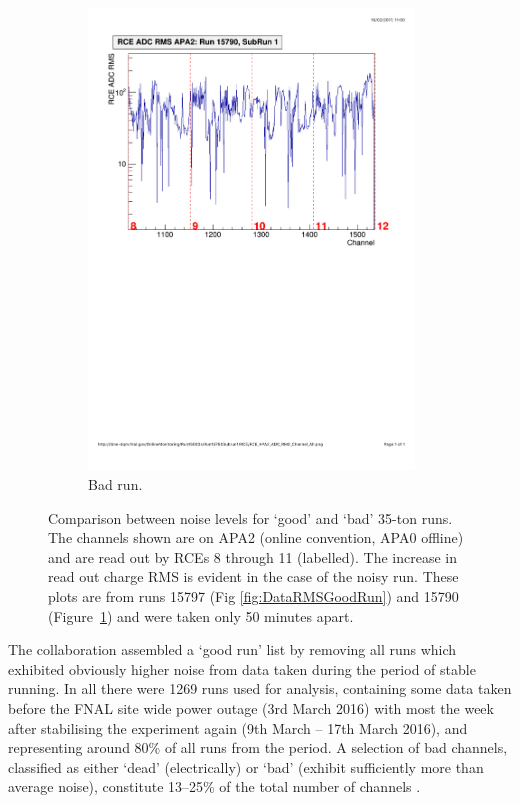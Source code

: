 \begin{figure}
\begin{subfigure}{0.45\linewidth}
  \end{subfigure}
  \hfill
  \begin{subfigure}{0.45\linewidth}
    \centering
    \includegraphics[width=0.95\textwidth]{DataRMSBad.pdf}
    \caption{Bad run.}
    \label{fig:DataRMSBadRun}
  \end{subfigure}
  \caption[Comparison between noise levels for `good' and `bad' 35-ton runs.]{Comparison between noise levels for `good' and `bad' 35-ton runs.  The channels shown are on APA2 (online convention, APA0 offline) and are read out by RCEs 8 through 11 (labelled).  The increase in read out charge RMS is evident in the case of the noisy run.  These plots are from runs 15797 (Fig \ref{fig:DataRMSGoodRun}) and 15790 (Figure~\ref{fig:DataRMSBadRun}) and were taken only 50 minutes apart.}
  \label{fig:DataRMS}
\end{figure}

The collaboration assembled a `good run' list by removing all runs which exhibited obviously higher noise from data taken during the period of stable running.  In all there were 1269 runs used for analysis, containing some data taken before the FNAL site wide power outage (3rd March 2016) with most the week after stabilising the experiment again (9th March -- 17th March 2016), and representing around 80\% of all runs from the period.  A selection of bad channels, classified as either `dead' (electrically) or `bad' (exhibit sufficiently more than average noise), constitute 13--25\% of the total number of channels \cite{Kirby2016}.

